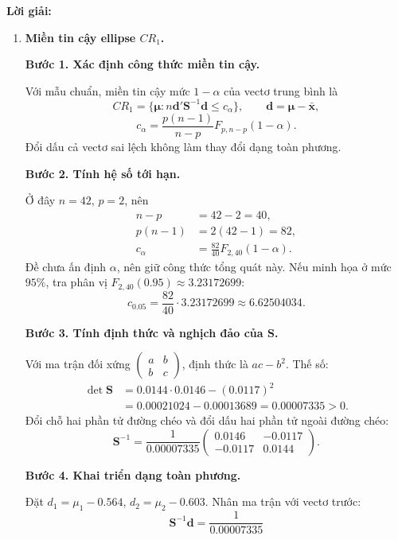\documentclass[11pt,a4paper]{article}
\renewcommand{\boldsymbol}[1]{\symbf{#1}}
\newenvironment{solution}{%
  \par\medskip\noindent\textbf{Lời giải:}\par\nobreak\smallskip\noindent\ignorespaces
}{\par}
\newcommand{\answer}[1]{\boxed{#1}}
\newcommand{\step}[2]{\par\medskip\noindent\textbf{Bước #1. #2}\par\nopagebreak[4]\smallskip\noindent}
\begin{document}
\begin{solution}
\begin{enumerate}[label=\textbf{\alph*)}]
\begin{align*}
=\frac{0.4797}{42}\approx0.0114214,\\
\widehat{\Sigma}_{22}&=\frac{41}{42}\cdot0.0146
=\frac{0.5986}{42}\approx0.0142524.
\end{align*}
Tính đối xứng cho $\widehat{\Sigma}_{21}=\widehat{\Sigma}_{12}$. Kết luận:
\[
\answer{\widehat{\boldsymbol{\Sigma}}_{\mathrm{ML}}
\approx\begin{pmatrix}0.0140571&0.0114214\\0.0114214&0.0142524\end{pmatrix}}.
\]
Ước lượng ML dùng mẫu số $n$; thống kê Hotelling ở các câu sau vẫn dùng
$\mathbf{S}$ với mẫu số $n-1$.
\item \textbf{Miền tin cậy ellipse $CR_1$.}\par\nopagebreak[4]
\step{1}{Xác định công thức miền tin cậy.}
Với mẫu chuẩn, miền tin cậy mức $1-\alpha$ của vectơ trung bình là
\[
CR_1=\{\boldsymbol{\mu}:n\mathbf{d}'\mathbf{S}^{-1}\mathbf{d}\le c_\alpha\},
\qquad\mathbf{d}=\boldsymbol{\mu}-\bar{\mathbf{x}},
\]
\[
c_\alpha=\frac{p(n-1)}{n-p}F_{p,n-p}(1-\alpha).
\]
Đổi dấu cả vectơ sai lệch không làm thay đổi dạng toàn phương.
\step{2}{Tính hệ số tới hạn.}
Ở đây $n=42$, $p=2$, nên
\begin{align*}
n-p&=42-2=40,\\
p(n-1)&=2(42-1)=82,\\
c_\alpha&=\frac{82}{40}F_{2,40}(1-\alpha).
\end{align*}
Đề chưa ấn định $\alpha$, nên giữ công thức tổng quát này.
Nếu minh họa ở mức $95\%$, tra phân vị $F_{2,40}(0.95)\approx3.23172699$:
\[
c_{0.05}=\frac{82}{40}\cdot3.23172699\approx6.62504034.
\]
\step{3}{Tính định thức và nghịch đảo của $\mathbf{S}$.}
Với ma trận đối xứng $\begin{pmatrix}a&b\\b&c\end{pmatrix}$,
định thức là $ac-b^2$. Thế số:
\begin{align*}
\det\mathbf{S}&=0.0144\cdot0.0146-(0.0117)^2\\
&=0.00021024-0.00013689=0.00007335>0.
\end{align*}
Đổi chỗ hai phần tử đường chéo và đổi dấu hai phần tử ngoài đường chéo:
\[
\mathbf{S}^{-1}=\frac1{0.00007335}
\begin{pmatrix}0.0146&-0.0117\\-0.0117&0.0144\end{pmatrix}.
\]
\step{4}{Khai triển dạng toàn phương.}
Đặt $d_1=\mu_1-0.564$, $d_2=\mu_2-0.603$. Nhân ma trận với vectơ trước:
\[
\mathbf{S}^{-1}\mathbf{d}=\frac1{0.00007335}
\]
\end{enumerate}
\end{solution}
\end{document}

